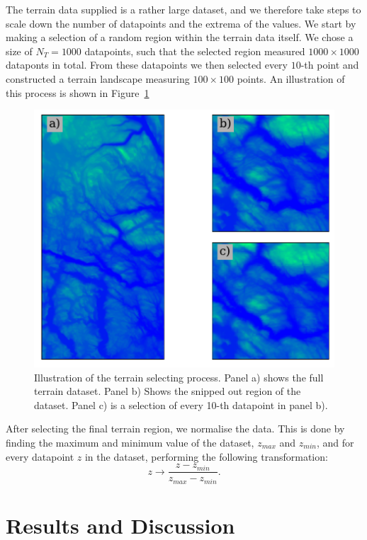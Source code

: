 \documentclass[a4paper, 
amsfonts, 
amssymb, 
amsmath, 
reprint, 
showkeys, 
nofootinbib, 
twoside]{revtex4-2}
\begin{document}
The terrain data supplied is a rather large dataset, and we therefore take steps to scale down the number of datapoints and the extrema of the values. 
We start by making a selection of a random region within the terrain data itself. We chose a size of $N_T = 1000$ datapoints, such that the selected region measured $1000 \times 1000$ dataponts in total. From these datapoints we then selected every $10$-th point and constructed a terrain landscape measuring $100 \times 100$ points. An illustration of this process is shown in Figure~\ref{fig:terrain_select}
\begin{figure}
    \centering
    \includegraphics[width = \linewidth]{Figures/terrain_select.pdf}
    \caption{Illustration of the terrain selecting process. Panel a) shows the full terrain dataset. Panel b) Shows the snipped out region of the dataset. Panel c) is a selection of every 10-th datapoint in panel b).}
    \label{fig:terrain_select}
\end{figure}
After selecting the final terrain region, we normalise the data. This is done by finding the maximum and minimum value of the dataset, $z_{max}$ and $z_{min}$, and for every datapoint $z$ in the dataset, performing the following transformation:
\begin{equation}
    z \rightarrow \frac{z - z_{min}}{z_{max} - z_{min}}.
\end{equation}


\section{Results and Discussion}
\label{results}
\end{document}
